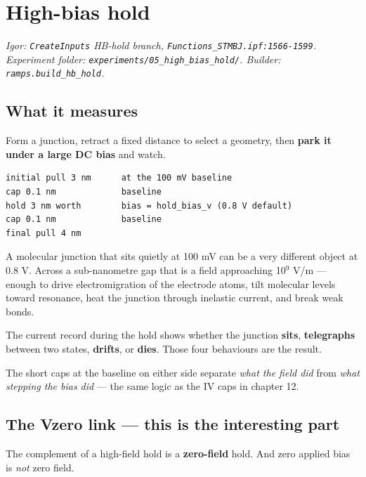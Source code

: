 \setcounter{chapter}{13}
\chapter{High-bias hold}

\emph{Igor: \texttt{Create\discretionary{}{}{}Inputs} HB-hold branch, \texttt{Functions\_\discretionary{}{}{}STMBJ.\discretionary{}{}{}ipf:1566-1599}. Experiment folder: \texttt{experiments/\discretionary{}{}{}05\_\discretionary{}{}{}high\_\discretionary{}{}{}bias\_\discretionary{}{}{}hold/\discretionary{}{}{}}. Builder: \texttt{ramps.\discretionary{}{}{}build\_\discretionary{}{}{}hb\_\discretionary{}{}{}hold}.}

\section{What it measures}

Form a junction, retract a fixed distance to select a geometry, then \textbf{park it under a large DC bias} and watch.

\begin{lstlisting}[style=out]
initial pull 3 nm      at the 100 mV baseline
cap 0.1 nm             baseline
hold 3 nm worth        bias = hold_bias_v (0.8 V default)
cap 0.1 nm             baseline
final pull 4 nm
\end{lstlisting}

A molecular junction that sits quietly at 100 mV can be a very different object at 0.8 V. Across a sub-nanometre gap that is a field approaching 10$^9$ V/m --- enough to drive electromigration of the electrode atoms, tilt molecular levels toward resonance, heat the junction through inelastic current, and break weak bonds.

The current record during the hold shows whether the junction \textbf{sits}, \textbf{telegraphs} between two states, \textbf{drifts}, or \textbf{dies}. Those four behaviours are the result.

The short caps at the baseline on either side separate \emph{what the field did} from \emph{what stepping the bias did} --- the same logic as the IV caps in chapter 12.

\section{The Vzero link --- this is the interesting part}

The complement of a high-field hold is a \textbf{zero-field} hold. And zero applied bias is \emph{not} zero field.


